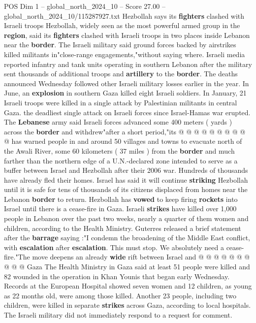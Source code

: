 \begin{textsample}{POS Dim 1 – global\_north\_2024\_10 – Score 27.00 – global\_north\_2024\_10/115287927.txt}
Hezbollah says its \textbf{fighters} clashed with Israeli troops Hezbollah, widely seen as the most powerful armed group in the \textbf{region}, said its \textbf{fighters} clashed with Israeli troops in two places inside Lebanon near the \textbf{border}.
The Israeli military said ground forces backed by airstrikes killed militants in"close-range engagements,"without saying where.
Israeli media reported infantry and tank units operating in southern Lebanon after the military sent thousands of additional troops and \textbf{artillery} to the \textbf{border}.
The deaths announced Wednesday followed other Israeli military losses earlier in the year.
In June, an \textbf{explosion} in southern Gaza killed eight Israeli soldiers.
In January, 21 Israeli troops were killed in a single attack by Palestinian militants in central Gaza. the deadliest single attack on Israeli forces since Israel-Hamas war erupted.
The \textbf{Lebanese} army said Israeli forces advanced some 400 meters ( yards ) across the \textbf{border} and withdrew"after a short period,"its @ @ @ @ @ @ @ @ @ @ has warned people in and around 50 villages and towns to evacuate north of the Awali River, some 60 kilometers ( 37 miles ) from the \textbf{border} and much farther than the northern edge of a U.N.-declared zone intended to serve as a buffer between Israel and Hezbollah after their 2006 war.
Hundreds of thousands have already fled their homes.
Israel has said it will continue \textbf{striking} Hezbollah until it is safe for tens of thousands of its citizens displaced from homes near the Lebanon \textbf{border} to return.
Hezbollah has \textbf{vowed} to keep firing \textbf{rockets} into Israel until there is a cease-fire in Gaza.
Israeli \textbf{strikes} have killed over 1,000 people in Lebanon over the past two weeks, nearly a quarter of them women and children, according to the Health Ministry.
Guterres released a brief statement after the \textbf{barrage} saying :"I condemn the broadening of the Middle East conflict, with \textbf{escalation} after \textbf{escalation}.
This must stop.
We absolutely need a cease-fire."The move deepens an already \textbf{wide} rift between Israel and @ @ @ @ @ @ @ @ @ @ Gaza The Health Ministry in Gaza said at least 51 people were killed and 82 wounded in the operation in Khan Younis that began early Wednesday.
Records at the European Hospital showed seven women and 12 children, as young as 22 months old, were among those killed.
Another 23 people, including two children, were killed in separate \textbf{strikes} across Gaza, according to local hospitals.
The Israeli military did not immediately respond to a request for comment.

\end{textsample}
